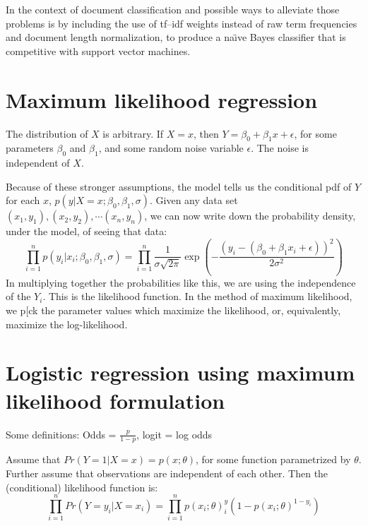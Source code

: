 \documentclass{article}
\begin{document}
In the context of document classification and possible ways to alleviate those problems is by including the use of tf–idf weights instead of raw term frequencies and document length normalization, to produce a na\"{\i}ve Bayes classifier that is competitive with support vector machines.

\section{Maximum likelihood regression}
The distribution of $X$ is arbitrary. If $X=x$, then $Y=\beta_0+\beta_1 x+\epsilon$, for some parameters $\beta_0$ and $\beta_1$, and some random noise variable $\epsilon$. The noise is independent of $X$.

Because of these stronger assumptions, the model tells us the conditional pdf of $Y$ for each $x$, $p(y|X=x;\beta_0,\beta_1,\sigma)$. Given any data set $(x_1,y_1),(x_2,y_2),\cdots (x_n,y_n)$, we can now write down the probability density, under the model, of seeing that data:
\[
\prod_{i=1}^n p(y_i|x_i;\beta_0,\beta_1,\sigma) = \prod_{i=1}^n \frac{1}{\sigma\sqrt{2\pi}}  \exp \left( -\frac{(y_i-(\beta_0+\beta_1 x_i+\epsilon))^2}{2\sigma^2} \right)
\]
In multiplying together the probabilities like this, we are using the independence of the $Y_i$. This is the likelihood function. In the method of maximum likelihood, we p[ck the parameter values which  maximize  the  likelihood,  or,  equivalently,  maximize  the  log-likelihood.

\section{Logistic regression using maximum likelihood formulation}
Some definitions:
Odds = $\frac{p}{1-p}$, logit = log odds

Assume that $Pr(Y=1|X=x)=p(x;θ)$, for some function parametrized by $\theta$. Further assume that observations are independent of each other. Then the (conditional) likelihood function is:
\[
\prod_{i=1}^{n} Pr(Y=y_i|X=x_i) = \prod_{i=1}^{n} p(x_i;\theta)^y_i (1-p(x_i;\theta)^{1-y_i}) 
\]
\end{document}
